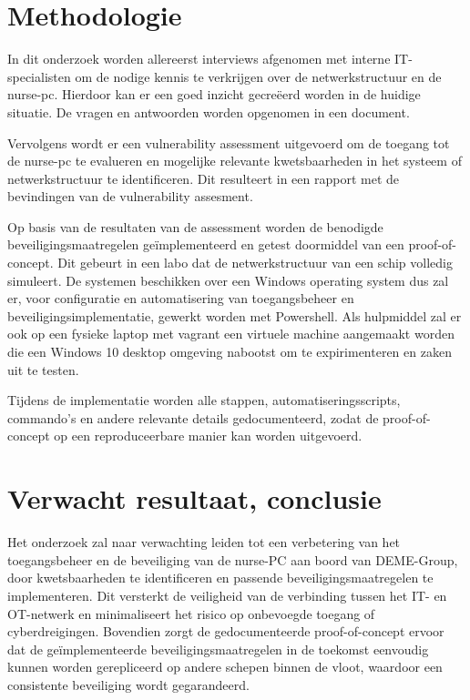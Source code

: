\section{Methodologie}%
\label{sec:methodologie}
In dit onderzoek worden allereerst interviews afgenomen met interne IT-specialisten om de nodige kennis te verkrijgen over de netwerkstructuur en de nurse-pc. 
Hierdoor kan er een goed inzicht gecreëerd worden in de huidige situatie. De vragen en antwoorden worden opgenomen in een document.

Vervolgens wordt er een vulnerability assessment uitgevoerd om de toegang tot de nurse-pc te evalueren en mogelijke relevante kwetsbaarheden in het systeem 
of netwerkstructuur te identificeren. Dit resulteert in een rapport met de bevindingen van de vulnerability assesment.

Op basis van de resultaten van de assessment worden de benodigde beveiligingsmaatregelen geïmplementeerd en getest doormiddel van een proof-of-concept. 
Dit gebeurt in een labo dat de netwerkstructuur van een schip volledig simuleert. De systemen beschikken over een Windows operating system dus zal er, voor configuratie en automatisering van toegangsbeheer en beveiligingsimplementatie, gewerkt worden met Powershell. 
Als hulpmiddel zal er ook op een fysieke laptop met vagrant een virtuele machine aangemaakt worden die een Windows 10 desktop omgeving nabootst om te expirimenteren en zaken uit te testen.

Tijdens de implementatie worden alle stappen, automatiseringsscripts, commando's en andere relevante details gedocumenteerd, 
zodat de proof-of-concept op een reproduceerbare manier kan worden uitgevoerd.


\section{Verwacht resultaat, conclusie}%
\label{sec:verwachte_resultaten}

Het onderzoek zal naar verwachting leiden tot een verbetering van het toegangsbeheer en de beveiliging van de nurse-PC aan boord 
van DEME-Group, door kwetsbaarheden te identificeren en passende beveiligingsmaatregelen te implementeren. Dit versterkt de veiligheid
van de verbinding tussen het IT- en OT-netwerk en minimaliseert het risico op onbevoegde toegang of cyberdreigingen. 
Bovendien zorgt de gedocumenteerde proof-of-concept ervoor dat de geïmplementeerde beveiligingsmaatregelen in de toekomst eenvoudig kunnen 
worden gerepliceerd op andere schepen binnen de vloot, waardoor een consistente beveiliging wordt gegarandeerd.

